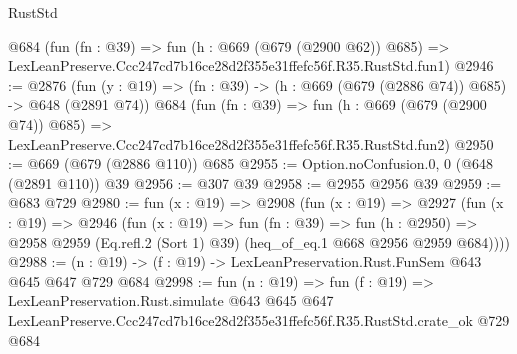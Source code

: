 \begin{lexlean}{RustStd}
\begin{coremodule}
    @684
    (fun (fn : @39) =>
    fun (h : @669 (@679 (@2900 @62)) @685) =>
    LexLeanPreserve.Ccc247cd7b16ce28d2f355e31ffefc56f.R35.RustStd.fun1)
@2946 := @2876
    (fun (y : @19) => (fn : @39) -> (h : @669 (@679 (@2886 @74)) @685) -> @648 (@2891 @74))
    @684
    (fun (fn : @39) =>
    fun (h : @669 (@679 (@2900 @74)) @685) =>
    LexLeanPreserve.Ccc247cd7b16ce28d2f355e31ffefc56f.R35.RustStd.fun2)
@2950 := @669 (@679 (@2886 @110)) @685
@2955 := Option.noConfusion.{0, 0} (@648 (@2891 @110)) @39
@2956 := @307 @39
@2958 := @2955 @2956 @39
@2959 := @683 @729
@2980 := fun (x : @19) =>
  @2908
    (fun (x : @19) =>
    @2927
      (fun (x : @19) =>
      @2946
        (fun (x : @19) =>
        fun (fn : @39) =>
        fun (h : @2950) =>
        @2958 @2959 (Eq.refl.{2} (Sort 1) @39) (heq_of_eq.{1} @668 @2956 @2959 @684))))
@2988 := (n : @19) -> (f : @19) -> LexLeanPreservation.Rust.FunSem @643 @645 @647 @729 @684
@2998 := fun (n : @19) =>
  fun (f : @19) =>
  LexLeanPreservation.Rust.simulate
    @643
    @645
    @647
    LexLeanPreserve.Ccc247cd7b16ce28d2f355e31ffefc56f.R35.RustStd.crate_ok
    @729
    @684
\end{coremodule}
\end{lexlean}
